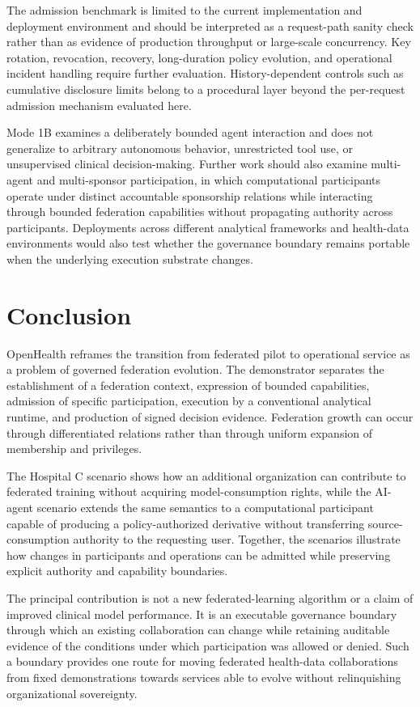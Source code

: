 \documentclass[twoside,11pt]{article}
\begin{document}
The admission benchmark is limited to the current implementation and deployment environment and should be interpreted as a request-path sanity check rather than as evidence of production throughput or large-scale concurrency. Key rotation, revocation, recovery, long-duration policy evolution, and operational incident handling require further evaluation. History-dependent controls such as cumulative disclosure limits belong to a procedural layer beyond the per-request admission mechanism evaluated here.

Mode 1B examines a deliberately bounded agent interaction and does not generalize to arbitrary autonomous behavior, unrestricted tool use, or unsupervised clinical decision-making. Further work should also examine multi-agent and multi-sponsor participation, in which computational participants operate under distinct accountable sponsorship relations while interacting through bounded federation capabilities without propagating authority across participants. Deployments across different analytical frameworks and health-data environments would also test whether the governance boundary remains portable when the underlying execution substrate changes. 

\section{Conclusion}

OpenHealth reframes the transition from federated pilot to operational service as a problem of governed federation evolution. The demonstrator separates the establishment of a federation context, expression of bounded capabilities, admission of specific participation, execution by a conventional analytical runtime, and production of signed decision evidence. Federation growth can  occur through differentiated relations rather than through uniform expansion of membership and privileges.

The Hospital C scenario shows how an additional organization can contribute to federated training without acquiring model-consumption rights, while the AI-agent scenario extends the same semantics to a computational participant capable of producing a policy-authorized derivative without transferring source-consumption authority to the requesting user. Together, the scenarios illustrate how changes in participants and operations can be admitted while preserving explicit authority and capability boundaries.

The principal contribution is   not a new federated-learning algorithm or a claim of improved clinical model performance. It is an executable governance boundary through which an existing collaboration can change while retaining auditable evidence of the conditions under which participation was allowed or denied. Such a boundary provides one route for moving federated health-data collaborations from fixed demonstrations towards services able to evolve without relinquishing organizational sovereignty.


 


\vskip 0.2in


%

\end{document}
